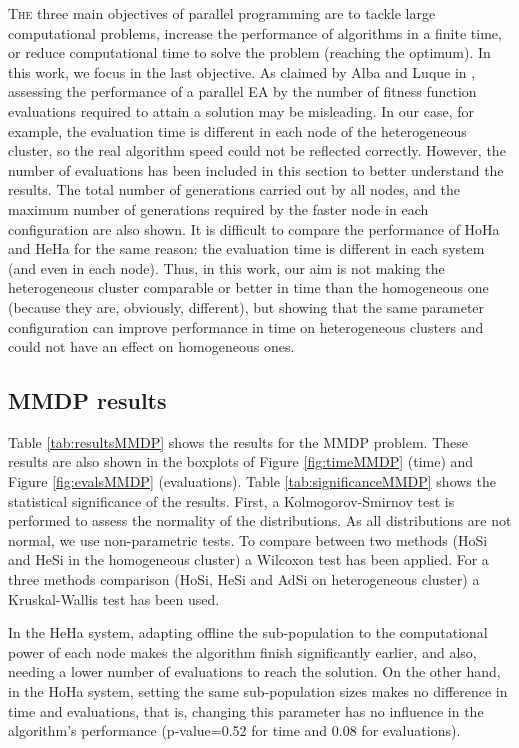 \label{chap:adaptiveresults}
\minitoc\mtcskip
\vfill
\lettrine{T}{he} three main objectives of parallel programming are to tackle large computational problems, increase the performance of algorithms in a finite time, or reduce computational time to solve the problem (reaching the optimum). In this work, we focus in the last objective.
As claimed by Alba and Luque in \cite{EVALUATIONPARALLEL}, assessing the performance of a parallel EA by the number of fitness function evaluations required to attain a solution may be misleading. In our case, for example, the evaluation time is different in each node of the heterogeneous cluster, so the real algorithm speed could not be reflected correctly. However, the number of evaluations has been included in this section to better understand the results. The total number of generations carried out by all nodes, and the maximum number of generations required by the faster node in each configuration are also shown. It is difficult to compare the performance of HoHa and HeHa for the same reason: the evaluation time is different in each system (and even in each node). Thus, in this work, our aim is not making the heterogeneous cluster comparable or better in time than the homogeneous one (because they are, obviously, different), but showing that the same parameter configuration can improve performance in time on heterogeneous clusters and could not have an effect on homogeneous ones.

\subsection{MMDP results}

Table \ref{tab:resultsMMDP} shows the results for the MMDP problem. These results are also shown in the boxplots of Figure \ref{fig:timeMMDP} (time) and Figure \ref{fig:evalsMMDP} (evaluations). Table \ref{tab:significanceMMDP} shows the statistical significance of the results. First, a Kolmogorov-Smirnov test is performed to assess the normality of the distributions. As all distributions are not normal, we use non-parametric tests. To compare between two methods (HoSi and HeSi in the homogeneous cluster) a Wilcoxon test has been applied. For a three methods comparison (HoSi, HeSi and AdSi on heterogeneous cluster) a Kruskal-Wallis test has been used. 

 In the HeHa system, adapting offline the sub-population to the computational
 power of each node makes the algorithm finish significantly earlier,
 and also, needing a lower number of evaluations to reach the solution. On the other hand, in the HoHa system,
 setting the same sub-population sizes makes no difference in time and
 evaluations, that is, changing this parameter has no influence in the
 algorithm's performance (p-value=0.52 for time and 0.08 for evaluations).


